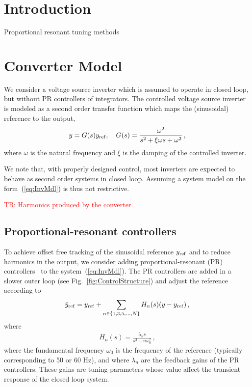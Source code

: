 \documentclass[conference,10pt]{IEEEtran}
\newcommand{\tb}[1]{\textcolor{red}{TB: #1}}
\begin{document}
\IEEEpeerreviewmaketitle


\section{Introduction}

 Proportional resonant tuning methods \cite{568021,6184594,6153368,5338054,6870109,993175,5398914 }




\section{Converter Model}




We consider a voltage source inverter which is assumed to operate in closed loop, but without PR controllers of integrators.  The controlled voltage source inverter is modeled as a second order transfer function which maps the (sinusoidal) reference to the output,
\begin{align}
\label{eq:InvMdl}
y = G(s)y_{\rm ref},\quad G(s) = \frac{\omega^2}{s^2+\xi\omega s + \omega^2}\,,
\end{align}
where $\omega$ is the natural frequency and $\xi$ is the damping of the controlled inverter.

We note that, with properly designed control, most inverters are expected to behave as second order systems in closed loop. Assuming a system model on the form~(\ref{eq:InvMdl}) is thus not restrictive.

\tb{Harmonics produced by the converter.}

\subsection{Proportional-resonant controllers}

To achieve offset free tracking of the sinusoidal reference $y_{\rm ref}$ and to reduce harmonics in the output, we consider adding proportional-resonant (PR) controllers~\cite{fukuda2001novel} to the system~(\ref{eq:InvMdl}).
The PR controllers are added in a slower outer loop (see Fig.~\ref{fig:ControlStructure}) and adjust the reference according to
\begin{align*}
\tilde{y}_{\rm ref} = y_{\rm ref} + \sum_{n\in\{1,3,5,\dots, N\}}H_n(s)(y-y_{\rm ref})\,,
\end{align*}
where
\begin{align*}
H_n(s) = \frac{\lambda_ns}{s^2 - n\omega^2_0}\,,
\end{align*}
where the fundamental frequency $\omega_0$ is the frequency of the reference (typically corresponding to 50 or 60 Hz), and where $\lambda_n$ are the feedback gains of the PR controllers. These gains are tuning parameters whose value affect the transient response of the closed loop system.
\end{document}
